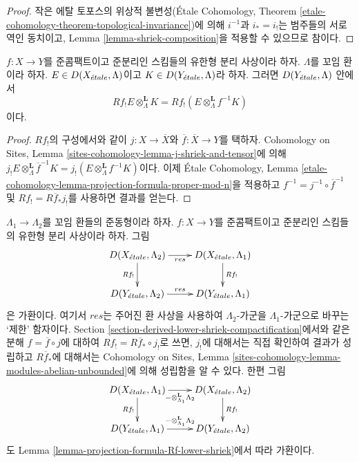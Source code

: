 \begin{proof}
작은 에탈 토포스의 위상적 불변성(\'Etale Cohomology, Theorem
\ref{etale-cohomology-theorem-topological-invariance})에 의해
$i^{-1}$과 $i_* = i_!$는 범주들의 서로 역인 동치이고,
Lemma \ref{lemma-shriek-composition}을 적용할 수 있으므로 참이다.
\end{proof}

\begin{lemma}
\label{lemma-projection-formula-Rf-lower-shriek}
$f : X \to Y$를 준콤팩트이고 준분리인 스킴들의 유한형 분리 사상이라
하자. $\Lambda$를 꼬임 환이라 하자.
$E \in D(X_{\acute{e}tale}, \Lambda)$이고 $K \in D(Y_{\acute{e}tale}, \Lambda)$라 하자.
그러면 $D(Y_{\acute{e}tale}, \Lambda)$ 안에서
$$
Rf_!E \otimes_\Lambda^\mathbf{L} K =
Rf_!(E \otimes_\Lambda^\mathbf{L} f^{-1}K)
$$
이다.
\end{lemma}

\begin{proof}
$Rf_!$의 구성에서와 같이 $j : X \to \overline{X}$와
$\overline{f} : \overline{X} \to Y$를 택하자.
Cohomology on Sites, Lemma
\ref{sites-cohomology-lemma-j-shriek-and-tensor}에 의해
$j_!E \otimes_\Lambda^\mathbf{L} \overline{f}^{-1}K =
j_!(E \otimes_\Lambda^\mathbf{L} f^{-1}K)$이다.
이제 \'Etale Cohomology, Lemma
\ref{etale-cohomology-lemma-projection-formula-proper-mod-n}을
적용하고 $f^{-1} = j^{-1} \circ \overline{f}^{-1}$ 및
$Rf_! = R\overline{f}_*j_!$를 사용하면 결과를 얻는다.
\end{proof}

\begin{remark}
\label{remark-Rf-lower-shriek-change-of-rings}
$\Lambda_1 \to \Lambda_2$를 꼬임 환들의 준동형이라 하자.
$f : X \to Y$를 준콤팩트이고 준분리인 스킴들의 유한형 분리 사상이라
하자. 그림
$$
\xymatrix{
D(X_\etale, \Lambda_2) \ar[r]_{res} \ar[d]_{Rf_!} &
D(X_\etale, \Lambda_1) \ar[d]^{Rf_!} \\
D(Y_\etale, \Lambda_2) \ar[r]^{res} &
D(Y_\etale, \Lambda_1)
}
$$
은 가환이다. 여기서 $res$는 주어진 환 사상을 사용하여
$\Lambda_2$-가군을 $\Lambda_1$-가군으로 바꾸는 ‘제한’ 함자이다.
Section \ref{section-derived-lower-shriek-compactification}에서와 같은
분해 $f = \overline{f} \circ j$에 대하여
$Rf_! = R\overline{f}_* \circ j_!$로 쓰면,
$j_!$에 대해서는 직접 확인하여 결과가 성립하고
$R\overline{f}_*$에 대해서는 Cohomology on Sites, Lemma
\ref{sites-cohomology-lemma-modules-abelian-unbounded}에 의해
성립함을 알 수 있다. 한편 그림
$$
\xymatrix{
D(X_\etale, \Lambda_1)
\ar[r]_{- \otimes_{\Lambda_1}^\mathbf{L} \Lambda_2} \ar[d]_{Rf_!} &
D(X_\etale, \Lambda_2) \ar[d]^{Rf_!} \\
D(Y_\etale, \Lambda_1)
\ar[r]^{- \otimes_{\Lambda_1}^\mathbf{L} \Lambda_2} &
D(Y_\etale, \Lambda_2)
}
$$
도 Lemma \ref{lemma-projection-formula-Rf-lower-shriek}에서 따라
가환이다.
\end{remark}

